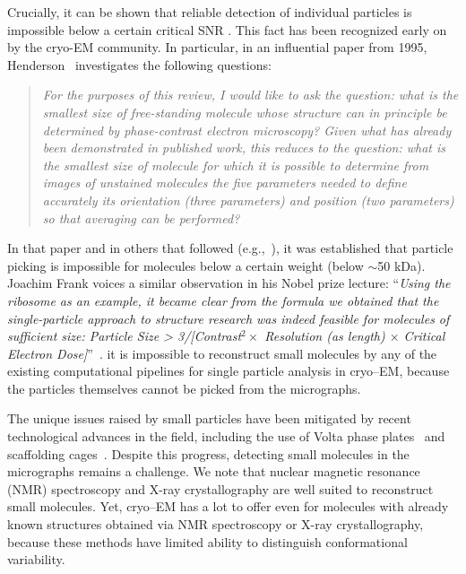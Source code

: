 \documentclass[9pt,twocolumn,twoside,lineno]{pnas-new}
\begin{document}
Crucially, it can be shown that reliable detection of individual particles is impossible below a certain critical SNR . This fact has been recognized early on by the cryo-EM community. In particular, in an influential paper from 1995, Henderson~\cite{henderson1995limitations} investigates the following questions:
\begin{quote}
	\emph{For the purposes of this review, I would like to ask the question: what is the smallest size of free-standing molecule whose structure can in principle be determined by phase-contrast electron microscopy? Given what has already been demonstrated in published work, this reduces to the question: what is the smallest size of molecule for which it is possible to determine from images of unstained molecules the five parameters needed to define accurately its orientation (three parameters) and position (two parameters) so that averaging can be performed?}
\end{quote}
In that paper and in others that followed (e.g.,~\cite{glaeser1999electron}), it was established that particle picking is impossible for molecules below a certain weight (below $\sim$50 kDa). 
Joachim Frank voices a similar observation in his Nobel prize lecture: ``\emph{Using the ribosome as an example, it became clear from the formula we obtained that the single-particle approach to structure research was indeed feasible for molecules of sufficient size: Particle Size > 3/[Contrast$^2\times $  Resolution (as length) $\times$ Critical Electron Dose]}''~\cite{frank2018single}. 
 it is impossible to reconstruct small molecules by any of the existing computational pipelines for single particle analysis in cryo--EM, because the particles themselves cannot be picked from the micrographs.

The unique issues raised by small particles have been mitigated by recent technological advances in the field, including the use of Volta phase plates~\cite{khoshouei2017cryo,liang2017phase} and scaffolding cages~\cite{liu2018nearatomic}.
Despite this progress, detecting small molecules in the micrographs remains a challenge.
We note that nuclear magnetic resonance (NMR) spectroscopy and X-ray crystallography are well suited to reconstruct small molecules. Yet, cryo--EM has a lot to offer even for molecules with already known structures obtained via NMR spectroscopy or X-ray crystallography, because these methods have limited ability to distinguish conformational variability. 
\end{document}
